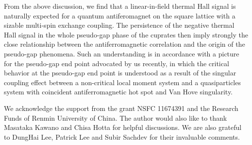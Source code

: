 \documentclass[prb,twocolumn,showpacs]{revtex4}
\begin{document}
From the above discussion, we find that a linear-in-field thermal Hall signal is naturally expected for a quantum antiferomagnet on the square lattice with a sizable multi-spin exchange coupling. The persistence of the negative thermal Hall signal in the whole pseudo-gap phase of the cuprates then imply strongly the close relationship between the antiferromagnetic correlation and the origin of the pseudo-gap phenomena. Such an understanding is in accordance with a picture for the pseudo-gap end point advocated by us recently\cite{Li}, in which the critical behavior at the pseudo-gap end point is understood as a result of the singular coupling effect between a non-critical local moment system and a quasiparticles system with coincident antiferromagnetic hot spot and Van Hove singularity. 

We acknowledge the support from the grant NSFC 11674391 and the Research Funds of Renmin University of China. The author would also like to thank Masataka Kawano and Chisa Hotta for helpful discussions. We are also grateful to DungHai Lee, Patrick Lee and Subir Sachdev for their invaluable comments. 
\end{document}
